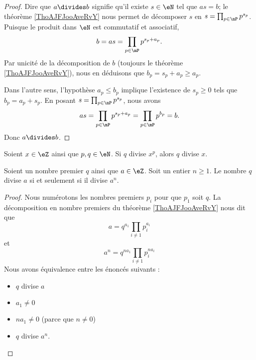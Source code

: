 \begin{proof}
	Dire que \( a\divides b\) signifie qu'il existe \( s\in \eN\) tel que \( as=b\); le théorème \ref{ThoAJFJooAveRvY} nous permet de décomposer \( s\) en \( s=\prod_{p\in\mP}p^{s_p}\). Puisque le produit dans \( \eN\) est commutatif et associatif,
	\begin{equation}
		b=as=\prod_{p\in\mP}p^{s_p+a_p}.
	\end{equation}
	Par unicité de la décomposition de \( b\) (toujours le théorème \ref{ThoAJFJooAveRvY}), nous en déduisons que \( b_p=s_p+a_p\geq a_p\).

	Dans l'autre sens, l'hypothèse \( a_p\leq b_p\) implique l'existence de \( s_p\geq 0\) tels que \( b_p=a_p+s_p\). En posant \( s=\prod_{p\in\mP}p^{s_p}\), nous avons
	\begin{equation}
		as=\prod_{p\in\mP}p^{s_p+a_p}=\prod_{p\in \mP}p^{b_p}=b.
	\end{equation}
	Donc \( a\divides b\).
\end{proof}

\begin{proposition}     \label{PROPooBKQNooFglPGI}
	Soient \( x\in \eZ\) ainsi que \( p,q\in \eN\). Si \( q\) divise \( x^p\), alors \( q\) divise \( x\).
\end{proposition}

\begin{lemma}       \label{LEMooGLZHooUcRNgu}
	Soient un nombre premier \( q\) ainsi que \( a\in \eZ\). Soit un entier \( n\geq 1\). Le nombre \( q\) divise \( a\) si et seulement si il divise \( a^n\).
\end{lemma}

\begin{proof}
	Nous numérotons les nombres premiers \( p_i\) pour que \( p_1\) soit \( q\). La décomposition en nombre premiers du théorème \ref{ThoAJFJooAveRvY} nous dit que
	\begin{equation}
		a=q^{a_1}\prod_{i\neq 1}p_i^{a_i}
	\end{equation}
	et
	\begin{equation}
		a^n=q^{na_1}\prod_{i\neq 1}p_i^{na_i}
	\end{equation}
	Nous avons équivalence entre les énoncés suivants :
	\begin{itemize}
		\item \( q\) divise \( a\)
		\item \( a_1\neq 0\)
		\item \( na_1\neq 0\) (parce que \( n\neq 0\))
		\item \( q\) divise \( a^n\).
	\end{itemize}
\end{proof}

